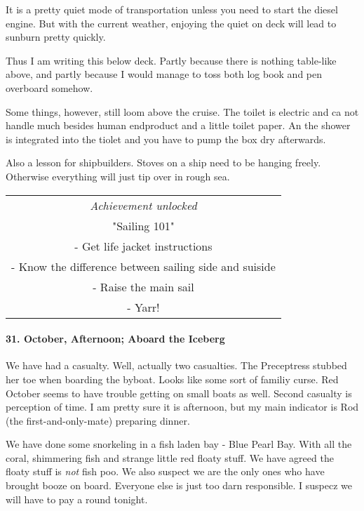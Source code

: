 It is a pretty quiet mode of transportation unless you need to start the diesel engine.
But with the current weather, enjoying the quiet on deck will lead to sunburn pretty quickly.

Thus I am writing this below deck.
Partly because there is nothing table-like above, and partly because I would manage to toss both log book and pen overboard somehow.

Some things, however, still loom above the cruise.
The toilet is electric and ca not handle much besides human endproduct and a little toilet paper.
An the shower is integrated into the tiolet and you have to pump the box dry afterwards.

Also a lesson for shipbuilders.
Stoves on a ship need to be hanging freely.
Otherwise everything will just tip over in rough sea.

\begin{center}
\begin{tabular}{||c||}
\emph{Achievement unlocked}\\
"Sailing 101"\\
\multicolumn{1}{||p{0.8\textwidth}||}{\footnotesize - Get life jacket instructions} \\
\multicolumn{1}{||p{0.8\textwidth}||}{\footnotesize - Know the difference between sailing side and suiside} \\
\multicolumn{1}{||p{0.8\textwidth}||}{\footnotesize - Raise the main sail} \\
\multicolumn{1}{||p{0.8\textwidth}||}{\footnotesize - Yarr!} \\
\end{tabular}
\end{center}

\paragraph{31. October, Afternoon; Aboard the Iceberg}
We have had a casualty.
Well, actually two casualties.
The Preceptress stubbed her toe when boarding the byboat.
Looks like some sort of familiy curse.
Red October seems to have trouble getting on small boats as well.
Second casualty is perception of time.
I am pretty sure it is afternoon, but my main indicator is Rod (the first-and-only-mate) preparing dinner.

We have done some snorkeling in a fish laden bay - Blue Pearl Bay.
With all the coral, shimmering fish and strange little red floaty stuff.
We have agreed the floaty stuff is \emph{not} fish poo.
We also suspect we are the only ones who have brought booze on board.
Everyone else is just too darn responsible.
I suspecz we will have to pay a round tonight.

